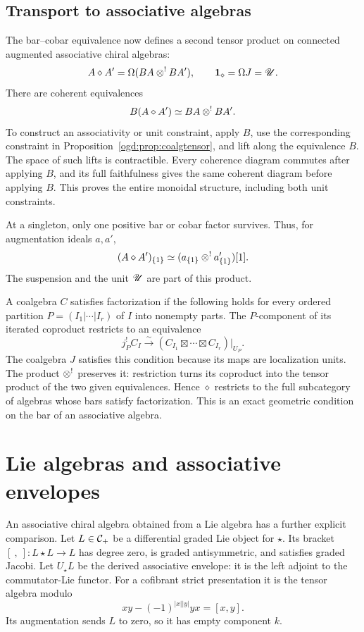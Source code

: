 \subsection{Transport to associative algebras}

The bar--cobar equivalence now defines a second tensor product on connected augmented associative chiral algebras:
\begin{equation}\label{ogd:eq:diamond}
 A\diamond A'=\Omega(BA\mathbin{\otimes^!} BA'),\qquad\mathbf1_\diamond=\Omega J=\mathscr U.
\end{equation}
There are coherent equivalences
\[
 B(A\diamond A')\simeq BA\mathbin{\otimes^!} BA'.
\]
To construct an associativity or unit constraint, apply \(B\), use the corresponding constraint in Proposition~\ref{ogd:prop:coalgtensor}, and lift along the equivalence \(B\).
The space of such lifts is contractible.
Every coherence diagram commutes after applying \(B\), and its full faithfulness gives the same coherent diagram before applying \(B\).
This proves the entire monoidal structure, including both unit constraints.

At a singleton, only one positive bar or cobar factor survives.
Thus, for augmentation ideals \(a,a'\),
\[
 (A\diamond A')_{\{1\}}\simeq(a_{\{1\}}\mathbin{\otimes^!} a'_{\{1\}})[1].
\]
The suspension and the unit \(\mathscr U\) are part of this product.

A coalgebra \(C\) satisfies factorization if the following holds for every ordered partition \(P=(I_1|\cdots|I_r)\) of \(I\) into nonempty parts.
The \(P\)-component of its iterated coproduct restricts to an equivalence
\begin{equation}\label{ogd:eq:factorization}
 j_P^!C_I\xrightarrow{\sim}
 (C_{I_1}\boxtimes\cdots\boxtimes C_{I_r})|_{U_P}.
\end{equation}
The coalgebra \(J\) satisfies this condition because its maps are localization units.
The product \(\mathbin{\otimes^!}\) preserves it: restriction turns its coproduct into the tensor product of the two given equivalences.
Hence \(\diamond\) restricts to the full subcategory of algebras whose bars satisfy factorization.
This is an exact geometric condition on the bar of an associative algebra.

\section{Lie algebras and associative envelopes}\label{ogd:sec:CE}

An associative chiral algebra obtained from a Lie algebra has a further explicit comparison.
Let\label{ogd:def:derived-associative-envelope} \(L\in\mathcal C_+\) be a differential graded Lie object for \(\star\).
Its bracket \([\ ,\ ]:L\star L\to L\) has degree zero, is graded antisymmetric, and satisfies graded Jacobi.
Let \(U_\star L\) be the derived associative envelope: it is the left adjoint to the commutator-Lie functor.
For a cofibrant strict presentation it is the tensor algebra modulo
\[
 xy-(-1)^{|x||y|}yx=[x,y].
\]
Its augmentation sends \(L\) to zero, so it has empty component \(k\).

